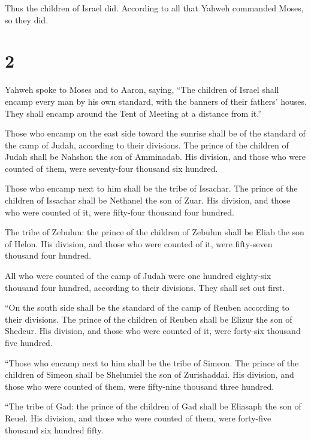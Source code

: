  Thus the children of Israel did. According to all that
Yahweh commanded Moses, so they did.

\hypertarget{section-1}{%
\section{2}\label{section-1}}

 Yahweh spoke to Moses and to Aaron, saying, 
``The children of Israel shall encamp every man by his own standard,
with the banners of their fathers' houses. They shall encamp around the
Tent of Meeting at a distance from it.''

 Those who encamp on the east side toward the sunrise shall
be of the standard of the camp of Judah, according to their divisions.
The prince of the children of Judah shall be Nahshon the son of
Amminadab.  His division, and those who were counted of
them, were seventy-four thousand six hundred.

 Those who encamp next to him shall be the tribe of
Issachar. The prince of the children of Issachar shall be Nethanel the
son of Zuar.  His division, and those who were counted of
it, were fifty-four thousand four hundred.

 The tribe of Zebulun: the prince of the children of Zebulun
shall be Eliab the son of Helon.  His division, and those
who were counted of it, were fifty-seven thousand four hundred.

 All who were counted of the camp of Judah were one hundred
eighty-six thousand four hundred, according to their divisions. They
shall set out first.

 ``On the south side shall be the standard of the camp of
Reuben according to their divisions. The prince of the children of
Reuben shall be Elizur the son of Shedeur.  His division,
and those who were counted of it, were forty-six thousand five hundred.

 ``Those who encamp next to him shall be the tribe of
Simeon. The prince of the children of Simeon shall be Shelumiel the son
of Zurishaddai.  His division, and those who were counted
of them, were fifty-nine thousand three hundred.

 ``The tribe of Gad: the prince of the children of Gad
shall be Eliasaph the son of Reuel.  His division, and
those who were counted of them, were forty-five thousand six hundred
fifty.


